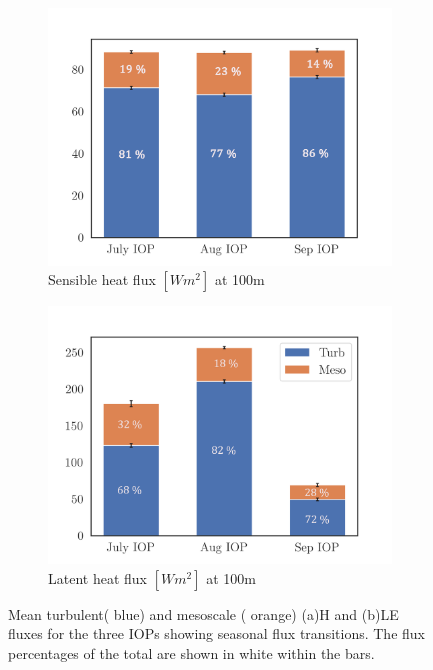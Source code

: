 \documentclass[draft]{agujournal2019}
\begin{document}
\begin{figure}[hbtp]
     \begin{subfigure}[b]{0.5\textwidth}
         \centering
         \includegraphics[width=\textwidth]{figures_main/H_IOP_100.png}
         \caption{Sensible heat flux $[W m^{2}]$ at 100m}
         \label{fig:H_IOP_100}
     \end{subfigure}
     \begin{subfigure}[b]{0.5\textwidth}
         \includegraphics[width=\textwidth]{figures_main/LE_IOP_100.png}
         \caption{Latent heat flux $[W m^{2}]$ at 100m}
         \label{fig:LE_IOP_100}
     \end{subfigure}
        \caption{Mean turbulent( blue) and mesoscale ( orange)  (a)H and (b)LE fluxes for the three IOPs showing seasonal flux transitions. The flux percentages of the total are shown in white within the bars.}
        \label{fig:IOP_100}
\end{figure} 
\end{document}
